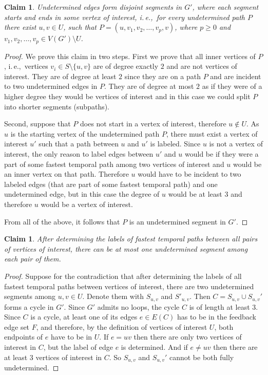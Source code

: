 \documentclass[11pt,a4paper]{article}
\newtheorem{claim}[theorem]{Claim}
\theoremstyle{remark}
\theoremstyle{definition}
\newcommand{\ie}{i.\,e.,\ }
\begin{document}
\begin{claim}
    Undetermined edges form disjoint segments in $G'$, where each segment starts and ends in some vertex of interest, 
    \ie for every undetermined path $P$ there exist $u,v \in U$, such that $P = (u, v_1, v_2, \dots, v_p, v)$, where $p \geq 0$ and $v_1,v_2,\dots,v_p \in V(G') \setminus U$.
\end{claim}
\begin{proof}
    We prove this claim in two steps.
    First we prove that all inner vertices of $P$, \ie vertices $v_i \in  S \setminus \{u,v\}$ are of degree exactly $2$ and are not vertices of interest. 
    They are of degree at least $2$ since they are on a path $P$ and are incident to two undetermined edges in  $P$.
    They are of degree at most $2$ as if they were of a higher degree they would be vertices of interest and in this case we could split $P$ into shorter segments (subpaths).
    
    Second, suppose that $P$ does not start in a vertex of interest, therefore $u \notin U$. As $u$ is the starting vertex of the undetermined path $P$, there must exist a vertex of interest $u'$ such that a path between $u$ and $u'$ is labeled.
    Since $u$ is not a vertex of interest, the only reason to label edges between $u'$ and $u$ would be if they were a part of some fastest temporal path among two vertices of interest and $u$ would be an inner vertex on that path.
    Therefore $u$ would have to be incident to two labeled edges (that are part of some fastest temporal path) and one undetermined edge, but in this case the degree of $u$ would be at least $3$ and therefore $u$ would be a vertex of interest.

    From all of the above, it follows that $P$ is an undetermined segment in $G'$.
\end{proof}

\begin{claim}
    After determining the labels of fastest temporal paths between all pairs of vertices of interest,
    there can be at most one undetermined segment among each pair of them.
\end{claim}
\begin{proof}
   Suppose for the contradiction that after determining the labels of all fastest temporal paths between vertices of interest,
   there are two undetermined segments among $u,v \in U$.
   Denote them with $S_{u,v}$ and $S'_{u,v}$. 
   Then $C = S_{u,v} \cup S_{u,v}'$ forms a cycle in $G'$. Since $G'$ admits no loops, the cycle $C$ is of length at least $3$.
   Since $C$ is a cycle, at least one of its edges $e \in E(C)$ has to be in the feedback edge set $F$, and therefore, by the definition of vertices of interest $U$, 
   both endpoints of $e$ have to be in $U$.
   If $e = uv$ then there are only two vertices of interest in $C$, but the label of edge $e$ is determined.
   And if $e \neq uv$ then there are at least $3$ vertices of interest in $C$.
   So $S_{u,v}$ and $S_{u,v}'$ cannot be both fully undetermined.
\end{proof}
\end{document}
